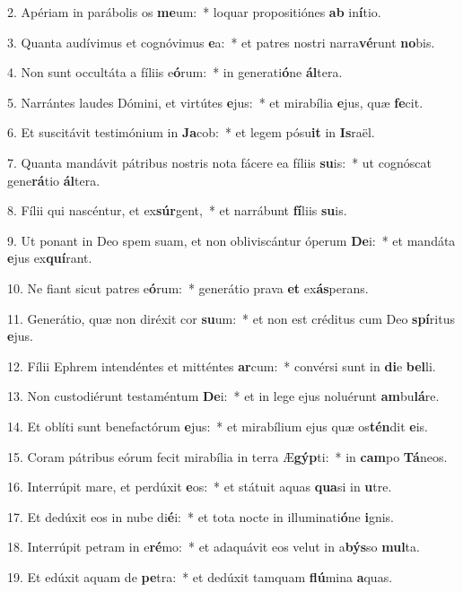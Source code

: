 2. Apériam in parábolis os \textbf{me}um:~*  loquar propositiónes \textbf{ab} in\textbf{í}tio.\

3. Quanta audívimus et cognóvimus \textbf{e}a:~*  et patres nostri narra\textbf{vé}runt \textbf{no}bis.\

4. Non sunt occultáta a fíliis e\textbf{ó}rum:~*  in generati\textbf{ó}ne \textbf{ál}tera.\

5. Narrántes laudes Dómini, et virtútes \textbf{e}jus:~*  et mirabília \textbf{e}jus, quæ \textbf{fe}cit.\

6. Et suscitávit testimónium in \textbf{Ja}cob:~*  et legem pósu\textbf{it} in \textbf{Is}raël.\

7. Quanta mandávit pátribus nostris nota fácere ea fíliis \textbf{su}is:~*  ut cognóscat gene\textbf{rá}tio \textbf{ál}tera.\

8. Fílii qui nascéntur, et ex\textbf{súr}gent,~*  et narrábunt \textbf{fí}liis \textbf{su}is.\

9. Ut ponant in Deo spem suam, et non obliviscántur óperum \textbf{De}i:~*  et mandáta \textbf{e}jus ex\textbf{quí}rant.\

10. Ne fiant sicut patres e\textbf{ó}rum:~*  generátio prava \textbf{et} ex\textbf{ás}perans.\

11. Generátio, quæ non diréxit cor \textbf{su}um:~*  et non est créditus cum Deo \textbf{spí}ritus \textbf{e}jus.\

12. Fílii Ephrem intendéntes et mitténtes \textbf{ar}cum:~*  convérsi sunt in \textbf{di}e \textbf{bel}li.\

13. Non custodiérunt testaméntum \textbf{De}i:~*  et in lege ejus noluérunt \textbf{am}bu\textbf{lá}re.\

14. Et oblíti sunt benefactórum \textbf{e}jus:~*  et mirabílium ejus quæ os\textbf{tén}dit \textbf{e}is.\

15. Coram pátribus eórum fecit mirabília in terra Æ\textbf{gýp}ti:~*  in \textbf{cam}po \textbf{Tá}neos.\

16. Interrúpit mare, et perdúxit \textbf{e}os:~*  et státuit aquas \textbf{qua}si in \textbf{u}tre.\

17. Et dedúxit eos in nube di\textbf{é}i:~*  et tota nocte in illuminati\textbf{ó}ne \textbf{i}gnis.\

18. Interrúpit petram in e\textbf{ré}mo:~*  et adaquávit eos velut in a\textbf{býs}so \textbf{mul}ta.\

19. Et edúxit aquam de \textbf{pe}tra:~*  et dedúxit tamquam \textbf{flú}mina \textbf{a}quas.\

